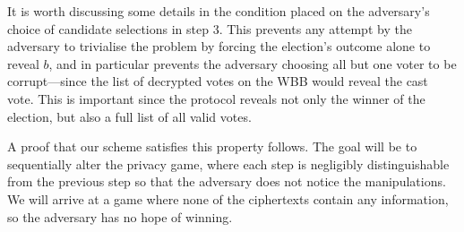 \documentclass[12pt,a4paper]{article}
\theoremstyle{definition}
\newcounter{protocol}
\begin{document}
It is worth discussing some details in the condition placed on the adversary's choice of candidate selections in step 3. This prevents any attempt by the adversary to trivialise the problem by forcing the election's outcome alone to reveal $b$, and in particular prevents the adversary choosing all but one voter to be corrupt---since the list of decrypted votes on the WBB would reveal the cast vote. This is important since the protocol reveals not only the winner of the election, but also a full list of all valid votes.

A proof that our scheme satisfies this property follows. The goal will be to sequentially alter the privacy game, where each step is negligibly distinguishable from the previous step so that the adversary does not notice the manipulations. We will arrive at a game where none of the ciphertexts contain any information, so the adversary has no hope of winning.
\end{document}
